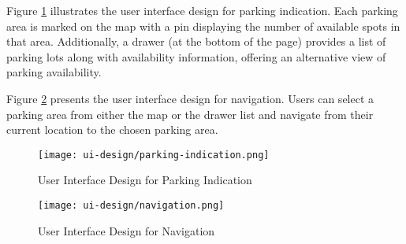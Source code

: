 Figure \ref{fig:ui_parking_indication} illustrates the user interface design for parking indication. Each parking area is marked on the map with a pin displaying the number of available spots in that area. Additionally, a drawer (at the bottom of the page) provides a list of parking lots along with availability information, offering an alternative view of parking availability.

Figure \ref{fig:ui_navigation} presents the user interface design for navigation. Users can select a parking area from either the map or the drawer list and navigate from their current location to the chosen parking area.

\begin{figure}[h]
    \centering
    \texttt{[image: ui-design/parking-indication.png]}
    \caption{User Interface Design for Parking Indication}
    \label{fig:ui_parking_indication}
\end{figure}

\begin{figure}[h]
    \centering
    \texttt{[image: ui-design/navigation.png]}
    \caption{User Interface Design for Navigation}
    \label{fig:ui_navigation}
\end{figure}